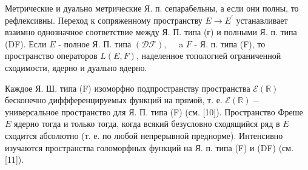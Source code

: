 \documentclass[10pt]{article}
\begin{document}
Метрические и дуально метрические Я. п. сепарабельны, а если они полны, то рефлексивны. Переход к сопряженному пространству $E \rightarrow E^{\prime}$ устанавливает взаимно однозначное соответствие между Я. П. типа (ғ) и полными Я. п. типа (DF). Если $E$ - полное Я. П. типа $(\mathscr{D F}), \quad$ a $F$ - Я. п. типа (F), то пространство операторов $L(E, F)$, наделенное топологией ограниченной сходимости, ядерно и дуально ядерно.



Каждое Я. Ш. типа (F) изоморфно подпространству пространства $\mathcal{E}(\mathbb{R})$ бесконечно диффференцируемых функций на прямой, т. е. $\mathscr{E}(\mathbb{R})-$ универсальное пространство для Я. П. типа (F) (см. [10]). Пространство Фреше $E$ ядерно тогда и только тогда, когда всякий безусловно сходящийся ряд в $E$ сходится абсолютно (т. е. по любой непрерывной преднорме). Интенсивно изучаются пространства голоморфных функций на Я. п. типа (F) и (DF) (см. [11]).
\end{document}
